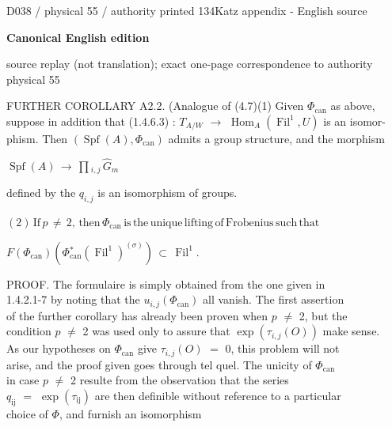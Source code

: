 \documentclass[9pt]{article}
\newcommand{\CanonText}[1]{\par{\fontsize{8.0}{9.35}\selectfont\RaggedRight #1\par}\vspace{2.2pt}}
\newcommand{\CanonDisplay}[1]{\par\vspace{1.2pt}\begin{center}{\fontsize{7.2}{8.4}\selectfont\(\displaystyle #1\)}\end{center}\vspace{1.2pt}}
\newcommand{\LayerTitle}{Canonical English edition}
\begin{document}
\noindent\begin{minipage}[t][\dimexpr\textheight-5pt\relax][t]{\textwidth}
{\sffamily\fontsize{7.3}{8.2}\selectfont\color{Quiet} D038 / physical 55 / authority printed 134\hfill Katz appendix - English source}
\par{}\vspace{4.5pt}
{\sffamily\fontsize{10.4}{11.6}\selectfont\bfseries\color{Accent} \LayerTitle}
\par{\sffamily\fontsize{6.7}{7.7}\selectfont\color{Quiet} source replay (not translation); exact one-page correspondence to authority physical 55}
\vspace{5pt}
\CanonText{FURTHER COROLLARY A2.2. (Analogue of (4.7)(1) Given \(\Phi{}_{\mathrm{can}}\) as above,\\suppose in addition that (1.4.6.3) : \(T_{A/W}\) \(\to{}\) \(\operatorname{Hom}_{A}(\operatorname{Fil}^{1},U)\) is an isomor-\\phism. Then \((\operatorname{Spf}(A),\Phi{}_{\mathrm{can}})\) admits a group structure, and the morphism}
\CanonDisplay{\operatorname{Spf}(A)\,\to{}\,\prod{}_{i,j}\,\widehat{G}_{m}}
\CanonText{defined by the \(q_{i,j}\) is an isomorphism of groups.}
\CanonDisplay{(2)\,\text{If}\,p\,\neq{}\,2,\,\text{then}\,\Phi{}_{\mathrm{can}}\,\text{is}\,\text{the}\,\text{unique}\,\text{lifting}\,\text{of}\,\text{Frobenius}\,\text{such}\,\text{that}}
\CanonDisplay{F(\Phi{}_{\mathrm{can}})(\Phi{}_{\mathrm{can}}^{*}(\operatorname{Fil}^{1})^{(\sigma{})})\,\subset{}\,\operatorname{Fil}^{1}.}
\CanonText{PROOF. The formulaire is simply obtained from the one given in\\1.4.2.1-7 by noting that the \(u_{i,j}(\Phi{}_{\mathrm{can}})\) all vanish. The first assertion\\of the further corollary has already been proven when \(p\) \(\neq{}\) 2, but the\\condition \(p\) \(\neq{}\) 2 was used only to assure that \(\operatorname{exp}(\tau{}_{i,j}(O))\) make sense.\\As our hypotheses on \(\Phi{}_{\mathrm{can}}\) give \(\tau{}_{i,j}(O)\) \(=\) 0, this problem will not\\arise, and the proof given goes through tel quel. The unicity of \(\Phi{}_{\mathrm{can}}\)\\in case \(p\) \(\neq{}\) 2 resulte from the observation that the series\\\(q_{\mathrm{ij}}\) \(=\) \(\operatorname{exp}(\tau{}_{\mathrm{ij}})\) are then definible without reference to a particular\\choice of \(\Phi{}\), and furnish an isomorphism}

\end{minipage}
\end{document}
